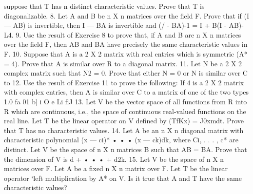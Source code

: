suppose that T has n distinct characteristic values. Prove that T is diagonalizable. 8. Let A and B be n X n matrices over the field F. Prove that if (I — AB) is invertible, then I — BA is invertible and (/ - BA)-1 = I + B(I - AB)-L4. 9. Use the result of Exercise 8 to prove that, if A and B are n X n matrices over the field F, then AB and BA have precisely the same characteristic values in F. 10. Suppose that A is a 2 X 2 matrix with real entries which is symmetric (A* = 4). Prove that A is similar over R to a diagonal matrix. 11. Let N be a 2 X 2 complex matrix such that N2 = 0. Prove that either N = 0 or N is similar over C to 12. Use the result of Exercise 11 to prove the following: If 4 is a 2 X 2 matrix with complex entries, then A is similar over C to a matrix of one of the two types 1.0 fa 01 b] i O e Li flJ 13. Let V be the vector space of all functions from R into R which are continuous, i.e., the space of continuous real-valued functions on the real line. Let T be the linear operator on V defined by (TfKx) = J0xmdt. Prove that T has no characteristic values. 14. Let A be an n X n diagonal matrix with characteristic polynomial (x — ci)* • • • (x — ck)dk, where Ci, . . . , c* are distinct. Let V be the space of n X n matrices B such that AB = BA. Prove that the dimension of V is d + • • • + d2k. 15. Let V be the space of n X n matrices over F. Let A be a fixed n X n matrix over F. Let T be the linear operator ‘left multiplication by A* on V. Is it true that A and T have the same characteristic values?

